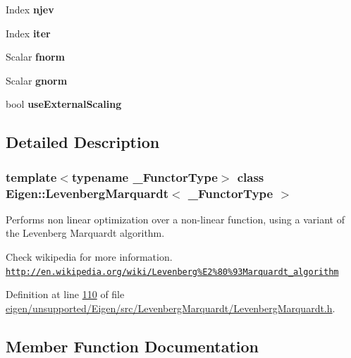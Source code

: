 \begin{DoxyCompactItemize}
Index {\bfseries njev}
\item 
\mbox{\label{class_eigen_1_1_levenberg_marquardt_a6e360685f776f224d37ac5381764cf40}} 
Index {\bfseries iter}
\item 
\mbox{\label{class_eigen_1_1_levenberg_marquardt_a0b1213dbe34b56e7be470613ae02ce4f}} 
Scalar {\bfseries fnorm}
\item 
\mbox{\label{class_eigen_1_1_levenberg_marquardt_abb98d67345ec05581634246e620fed3b}} 
Scalar {\bfseries gnorm}
\item 
\mbox{\label{class_eigen_1_1_levenberg_marquardt_a923bdb3e34ff8f16cb6e99348c78bd94}} 
bool {\bfseries use\+External\+Scaling}
\end{DoxyCompactItemize}


\subsection{Detailed Description}
\subsubsection*{template$<$typename \+\_\+\+Functor\+Type$>$\newline
class Eigen\+::\+Levenberg\+Marquardt$<$ \+\_\+\+Functor\+Type $>$}

Performs non linear optimization over a non-\/linear function, using a variant of the Levenberg Marquardt algorithm. 

Check wikipedia for more information. \href{http://en.wikipedia.org/wiki/Levenberg%E2%80%93Marquardt_algorithm}{\tt http\+://en.\+wikipedia.\+org/wiki/\+Levenberg\%\+E2\%80\%93\+Marquardt\+\_\+algorithm} 

Definition at line \hyperlink{eigen_2unsupported_2_eigen_2src_2_levenberg_marquardt_2_levenberg_marquardt_8h_source_l00110}{110} of file \hyperlink{eigen_2unsupported_2_eigen_2src_2_levenberg_marquardt_2_levenberg_marquardt_8h_source}{eigen/unsupported/\+Eigen/src/\+Levenberg\+Marquardt/\+Levenberg\+Marquardt.\+h}.



\subsection{Member Function Documentation}
\mbox{\label{class_eigen_1_1_levenberg_marquardt_a6e237ca1f23cdf5caa98fe23c6bcf464}} 
